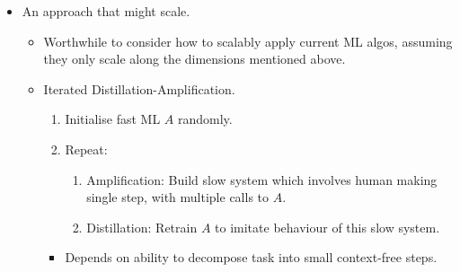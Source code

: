 \begin{itemize}
\begin{itemize}
\begin{itemize}
\begin{itemize}
            \end{itemize}
        \end{itemize}
        \item An approach that might scale.
        \begin{itemize}
            \item Worthwhile to consider how to scalably apply current ML algos, assuming they only scale along the dimensions mentioned above.
            \item Iterated Distillation-Amplification.
            \begin{enumerate}[label=\arabic*.]
                \item Initialise fast ML $A$ randomly.
                \item Repeat:
                \begin{enumerate}[label=\alph*.]
                    \item Amplification: Build slow system which involves human making single step, with multiple calls to $A$.
                    \item Distillation: Retrain $A$ to imitate behaviour of this slow system.
                \end{enumerate}
            \end{enumerate}
            \begin{itemize}
                \item Depends on ability to decompose task into small context-free steps.
            \end{itemize}
        \end{itemize}
    \end{itemize}
\end{itemize}